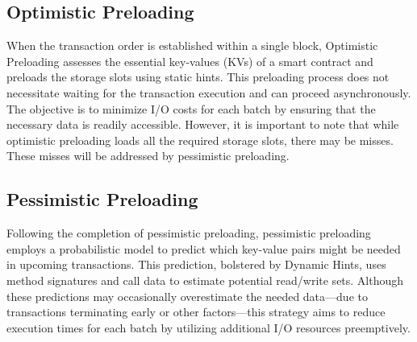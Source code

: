 \subsection{Optimistic Preloading}

When the transaction order is established within a single block, Optimistic Preloading assesses the essential key-values (KVs) of a smart contract and preloads the storage slots using static hints. This preloading process does not necessitate waiting for the transaction execution and can proceed asynchronously. The objective is to minimize I/O costs for each batch by ensuring that the necessary data is readily accessible. However, it is important to note that while optimistic preloading loads all the required storage slots, there may be misses. These misses will be addressed by pessimistic preloading.

\subsection{Pessimistic Preloading}

Following the completion of pessimistic preloading, pessimistic preloading employs a probabilistic model to predict which key-value pairs might be needed in upcoming transactions. This prediction, bolstered by Dynamic Hints, uses method signatures and call data to estimate potential read/write sets. Although these predictions may occasionally overestimate the needed data—due to transactions terminating early or other factors—this strategy aims to reduce execution times for each batch by utilizing additional I/O resources preemptively.